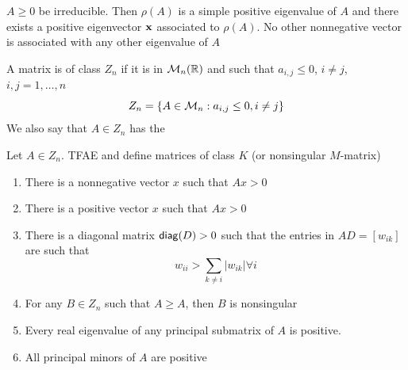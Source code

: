 \documentclass[aspectratio=169]{beamer}
\begin{document}
\begin{frame}{\cite{Fiedler2008}}
	\begin{theorem}
		\label{th:PerronFrobenius}
		$A\geq 0$ be irreducible. Then $\rho(A)$ is a simple positive eigenvalue of $A$ and there exists a positive eigenvector $\mathbf{x}$ associated to $\rho(A)$. No other nonnegative vector is associated with any other eigenvalue of $A$
	\end{theorem}
\end{frame}

\begin{frame}
	\begin{definition}
	\label{def:Z_n}
	A matrix is of class $Z_n$ if it is in $\mathcal{M}_n(\mathbb{R})$ and such that $a_{i,j}\leq 0$, $i \neq j$, $i,j=1,\ldots,n$
	\[
		Z_n=\{A\in \mathcal{M}_n: a_{i,j}\leq 0, i\neq j\}
	\]
	We also say that $A\in Z_n$ has the 
	\end{definition}
\end{frame}
	
	
\begin{frame}
	\begin{theorem}
	\label{th:Fiedler2008}
	Let $A\in Z_n$. TFAE and define matrices of class $K$ (or nonsingular $M$-matrix)
	\begin{enumerate}
		\item There is a nonnegative vector $x$ such that $Ax>0$
		\item There is a positive vector $x$ such that $Ax>0$
		\item There is a diagonal matrix $\mathsf{diag}(D)>0$ such that the entries in $AD=[w_{ik}]$ are such that 
		\[w_{ii}> \sum\limits_{k\neq i} | w_{ik}| \forall i\]
		\item For any $B\in Z_n$ such that $A\geq A$, then $B$ is nonsingular 
		\label{th:Fiedler2008_4}
		\item Every real eigenvalue of any principal submatrix of $A$ is positive.
		\item All principal minors of $A$ are positive
	\end{enumerate}
	\end{theorem}
\end{frame}
	
\end{document}
